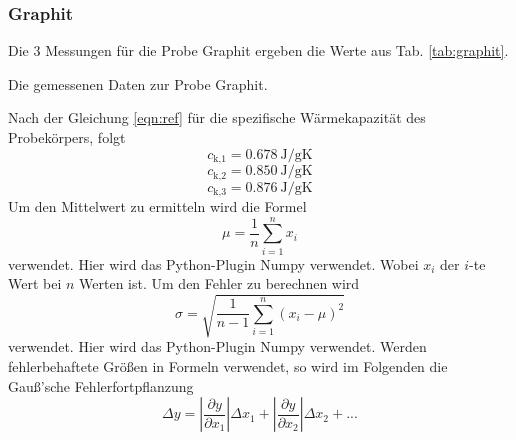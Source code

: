 \subsubsection{Graphit}
Die 3 Messungen für die Probe Graphit ergeben die Werte aus Tab. \ref{tab:graphit}.
\begin{table}
    \centering
    \caption{Die gemessenen Daten zur Probe Graphit. }
    \label{tab:graphit}  
\end{table}
Nach der Gleichung \eqref{eqn:ref} für die spezifische Wärmekapazität des Probekörpers, folgt
\begin{equation}
    c_\text{k,1} = \SI{0.678}{\joule/\gram\kelvin}
\end{equation}
\begin{equation}
    c_\text{k,2} = \SI{0.850}{\joule/\gram\kelvin}
\end{equation}
\begin{equation}
    c_\text{k,3} = \SI{0.876}{\joule/\gram\kelvin}
\end{equation}
Um den Mittelwert zu ermitteln wird die Formel
\begin{equation}
    \mu = \frac{1}{n} \sum_{i=1}^n x_i
    \label{eqn:mittel}
\end{equation}
verwendet. Hier wird das Python-Plugin Numpy \cite{numpy} verwendet.
Wobei $x_i$ der $i$-te Wert bei $n$ Werten ist.
Um den Fehler zu berechnen wird
\begin{equation}
    \sigma = \sqrt{\frac{1}{n-1} \sum_{i=1}^n (x_i - \mu)^2}
    \label{eqn:fehler}
\end{equation}
verwendet. Hier wird das Python-Plugin Numpy \cite{numpy} verwendet.
Werden fehlerbehaftete Größen in Formeln verwendet, so wird im Folgenden die Gauß'sche Fehlerfortpflanzung 
\begin{equation}
    \Delta y = \left|\frac{\partial y}{\partial x_1}\right| \Delta x_1 + \left|\frac{\partial y}{\partial x_2}\right| \Delta x_2 + ...
\end{equation}
